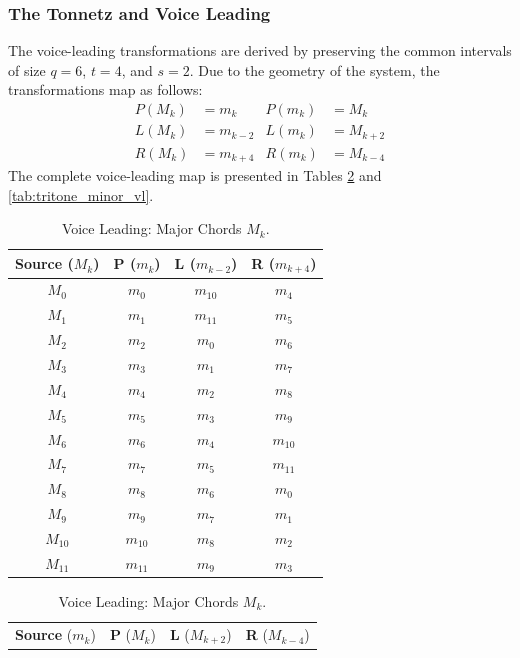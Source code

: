 \documentclass[12pt,letterpaper]{amsart}
\begin{document}
\subsubsection{The Tonnetz and Voice Leading}
The voice-leading transformations are derived by preserving the common intervals of size $q=6$, $t=4$, and $s=2$. Due to the geometry of the system, the transformations map as follows:
\begin{align*}
    P(M_k) &= m_k & P(m_k) &= M_k \\
    L(M_k) &= m_{k-2} & L(m_k) &= M_{k+2} \\
    R(M_k) &= m_{k+4} & R(m_k) &= M_{k-4}
\end{align*}
The complete voice-leading map is presented in Tables \ref{tab:tritone_major_vl} and \ref{tab:tritone_minor_vl}.

\begin{table}[H]
\centering
\scriptsize
\renewcommand{\arraystretch}{1.2}
\begin{minipage}{0.48\textwidth}
\centering
\begin{tabular}{|c||c|c|c|}
\hline
\textbf{Source} ($M_k$) & \textbf{P} ($m_k$) & \textbf{L} ($m_{k-2}$) & \textbf{R} ($m_{k+4}$) \\
\hline
$M_0$ & $m_0$ & $m_{10}$ & $m_4$ \\
$M_1$ & $m_1$ & $m_{11}$ & $m_5$ \\
$M_2$ & $m_2$ & $m_{0}$ & $m_6$ \\
$M_3$ & $m_3$ & $m_{1}$ & $m_7$ \\
$M_4$ & $m_4$ & $m_{2}$ & $m_8$ \\
$M_5$ & $m_5$ & $m_{3}$ & $m_9$ \\
$M_6$ & $m_6$ & $m_{4}$ & $m_{10}$ \\
$M_7$ & $m_7$ & $m_{5}$ & $m_{11}$ \\
$M_8$ & $m_8$ & $m_{6}$ & $m_{0}$ \\
$M_9$ & $m_9$ & $m_{7}$ & $m_{1}$ \\
$M_{10}$ & $m_{10}$ & $m_{8}$ & $m_{2}$ \\
$M_{11}$ & $m_{11}$ & $m_{9}$ & $m_{3}$ \\
\hline
\end{tabular}
\caption{Voice Leading: Major Chords $M_k$.}
\label{tab:tritone_major_vl}
\end{minipage}
\hfill
\begin{minipage}{0.48\textwidth}
\centering
\begin{tabular}{|c||c|c|c|}
\hline
\textbf{Source} ($m_k$) & \textbf{P} ($M_k$) & \textbf{L} ($M_{k+2}$) & \textbf{R} ($M_{k-4}$) \\

\end{tabular}
\end{minipage}
\end{table}
\end{document}

